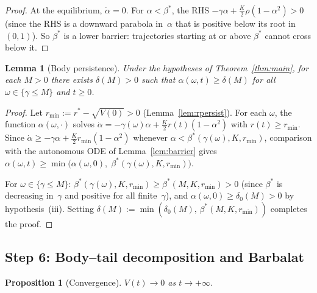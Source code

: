 \documentclass[11pt,a4paper]{article}
\newtheorem{lemma}[theorem]{Lemma}
\newtheorem{proposition}[theorem]{Proposition}
\theoremstyle{definition}
\begin{document}
\begin{proof}
At the equilibrium, $\dot\alpha=0$. For $\alpha<\beta^*$, the RHS $-\gamma\alpha+\tfrac{K}{2}\rho(1-\alpha^2)>0$ (since the RHS is a downward parabola in~$\alpha$ that is positive below its root in $(0,1)$). So $\beta^*$ is a lower barrier: trajectories starting at or above $\beta^*$ cannot cross below it.
\end{proof}

\begin{lemma}[Body persistence]\label{lem:body}
Under the hypotheses of Theorem~\ref{thm:main}, for each $M>0$ there exists $\delta(M)>0$ such that $\alpha(\omega,t)\geq\delta(M)$ for all $\omega\in\{\gamma\leq M\}$ and $t\geq 0$.
\end{lemma}

\begin{proof}
Let $r_{\min}:=r^*-\sqrt{V(0)}>0$ (Lemma~\ref{lem:rpersist}). For each $\omega$, the function $\alpha(\omega,\cdot)$ solves $\dot\alpha=-\gamma(\omega)\alpha+\tfrac{K}{2}r(t)(1-\alpha^2)$ with $r(t)\geq r_{\min}$. Since $\dot\alpha\geq -\gamma\alpha+\tfrac{K}{2}r_{\min}(1-\alpha^2)$ whenever $\alpha<\beta^*(\gamma(\omega),K,r_{\min})$, comparison with the autonomous ODE of Lemma~\ref{lem:barrier} gives $\alpha(\omega,t)\geq\min\bigl(\alpha(\omega,0),\;\beta^*(\gamma(\omega),K,r_{\min})\bigr)$.

For $\omega\in\{\gamma\leq M\}$: $\beta^*(\gamma(\omega),K,r_{\min})\geq\beta^*(M,K,r_{\min})>0$ (since $\beta^*$ is decreasing in~$\gamma$ and positive for all finite~$\gamma$), and $\alpha(\omega,0)\geq\delta_0(M)>0$ by hypothesis~(iii). Setting $\delta(M):=\min(\delta_0(M),\,\beta^*(M,K,r_{\min}))$ completes the proof.
\end{proof}

\subsection{Step 6: Body--tail decomposition and Barbalat}\label{sec:barbalat}

\begin{proposition}[Convergence]\label{prop:drop}
$V(t)\to 0$ as $t\to+\infty$.
\end{proposition}
\end{document}
